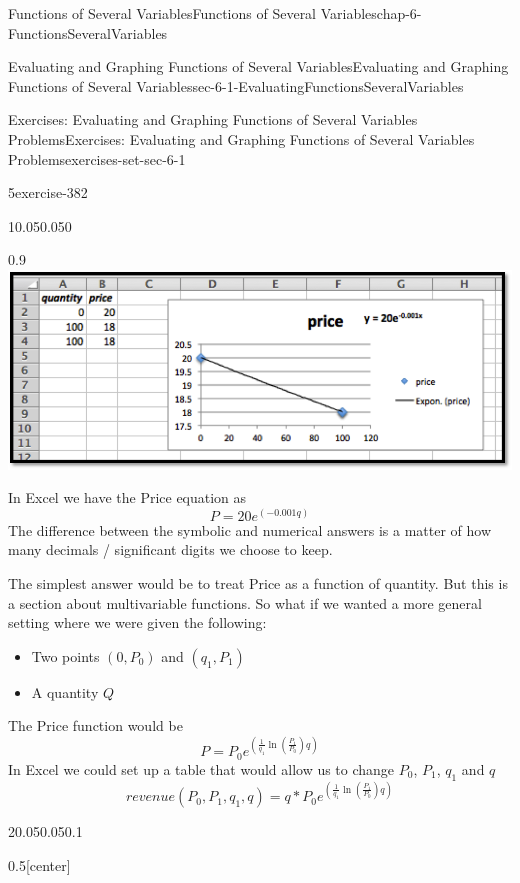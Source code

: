 \documentclass[oneside,10pt,]{book}
\numberwithin{equation}{section}
\begin{document}
\begin{chapterptx}{Functions of Several Variables}{}{Functions of Several Variables}{}{}{chap-6-FunctionsSeveralVariables}
\begin{sectionptx}{Evaluating and Graphing Functions of Several Variables}{}{Evaluating and Graphing Functions of Several Variables}{}{}{sec-6-1-EvaluatingFunctionsSeveralVariables}
\begin{exercises-subsection-numberless}{Exercises: Evaluating and Graphing Functions of Several Variables Problems}{}{Exercises: Evaluating and Graphing Functions of Several Variables Problems}{}{}{exercises-set-sec-6-1}
\begin{exercisegroup}
\begin{divisionexerciseeg}{5}{}{}{exercise-382}
\begin{sidebyside}{1}{0.05}{0.05}{0}
\begin{sbspanel}{0.9}
\includegraphics[width=1\linewidth]{images/sec6-1-sol5a.png}
\end{sbspanel}%
\end{sidebyside}%
\par
\hypertarget{p-2163}{}%
In Excel we have the Price equation as%
%
\begin{equation*}
P=20 e^{(-0.001 q)}
\end{equation*}
\hypertarget{p-2164}{}%
The difference between the symbolic and numerical answers is a matter of how many decimals \slash{} significant digits we choose to keep.%
\par
\hypertarget{p-2165}{}%
The simplest answer would be to treat Price as a function of quantity. But this is a section about multivariable functions. So what if we wanted a more general setting where we were given the following:%
\leavevmode%
\begin{itemize}[label=\textbullet]
\item{}\hypertarget{p-2166}{}%
Two points \((0,P_0)\) and \((q_1,P_1)\)%
\item{}\hypertarget{p-2167}{}%
A quantity \(Q\)%
\end{itemize}
\hypertarget{p-2168}{}%
The Price function would be%
%
\begin{equation*}
P=P_0  e^{\left(\frac{1}{q_1} \ln\left(\frac{P_1}{P_0}\right) q\right)}
\end{equation*}
\hypertarget{p-2169}{}%
In Excel we could set up a table that would allow us to change \(P_0\), \(P_1\), \(q_1\)  and \(q\)%
%
\begin{equation*}
revenue(P_0,P_1,q_1,q)=q*P_0  e^{\left(\frac{1}{q_1} \ln\left(\frac{P_1}{P_0}\right) q\right)}
\end{equation*}
\begin{sidebyside}{2}{0.05}{0.05}{0.1}%
\begin{sbspanel}{0.5}[center]%

\end{sbspanel}
\end{sidebyside}
\end{divisionexerciseeg}
\end{exercisegroup}
\end{exercises-subsection-numberless}
\end{sectionptx}
\end{chapterptx}
\end{document}
